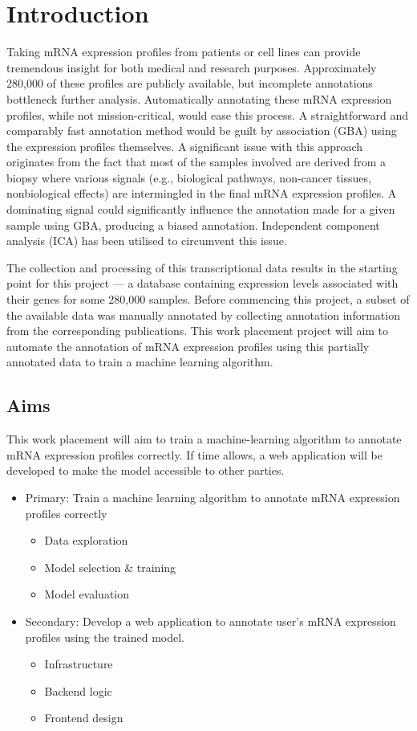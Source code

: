 \chapter{Introduction}
Taking mRNA expression profiles from patients or cell lines can provide tremendous insight for both medical and research purposes.
Approximately 280,000 of these profiles are publicly available, but incomplete annotations bottleneck further analysis.
Automatically annotating these mRNA expression profiles, while not mission-critical, would ease this process.
A straightforward and comparably fast annotation method would be guilt by association (GBA) using the expression profiles themselves.
A significant issue with this approach originates from the fact that most of the samples involved are derived from a biopsy where various signals (e.g., biological pathways, non-cancer tissues, nonbiological effects) are intermingled in the final mRNA expression profiles. A dominating signal could significantly influence the annotation made for a given sample using GBA, producing a biased annotation. Independent component analysis (ICA) has been utilised to circumvent this issue.

The collection and processing of this transcriptional data results in the starting point for this project — a database containing expression levels associated with their genes for some 280,000 samples.
Before commencing this project, a subset of the available data was manually annotated by collecting annotation information from the corresponding publications.
This work placement project will aim to automate the annotation of mRNA expression profiles using this partially annotated data to train a machine learning algorithm.

\section{Aims}
This work placement will aim to train a machine-learning algorithm to annotate mRNA expression profiles correctly.
If time allows, a web application will be developed to make the model accessible to other parties.

\begin{itemize}
    \item Primary: Train a machine learning algorithm to annotate mRNA expression profiles correctly
    \begin{itemize}
        \item Data exploration
        \item Model selection \& training
        \item Model evaluation
    \end{itemize}
    \item Secondary: Develop a web application to annotate user's mRNA expression profiles using the trained model.
    \begin{itemize}
        \item Infrastructure
        \item Backend logic
        \item Frontend design
    \end{itemize}
\end{itemize}
